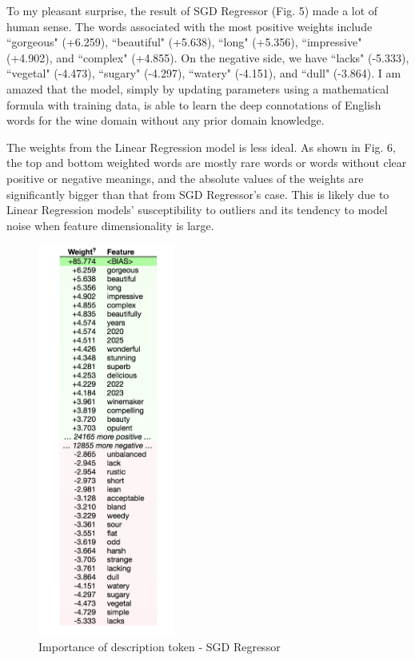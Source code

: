 \documentclass{article}
\begin{document}
To my pleasant surprise, the result of SGD Regressor (Fig. 5) made a lot of human sense. The words associated with the most positive weights include ``gorgeous" (+6.259), ``beautiful" (+5.638), ``long" (+5.356), ``impressive" (+4.902), and ``complex" (+4.855). On the negative side, we have ``lacks" (-5.333), ``vegetal" (-4.473), ``sugary" (-4.297), ``watery" (-4.151), and ``dull" (-3.864). I am amazed that the model, simply by updating parameters using a mathematical formula with training data, is able to learn the deep connotations of English words for the wine domain without any prior domain knowledge.

The weights from the Linear Regression model is less ideal. As shown in Fig. 6, the top and bottom weighted words are mostly rare words or words without clear positive or negative meanings, and the absolute values of the weights are significantly bigger than that from SGD Regressor's case. This is likely due to Linear Regression models' susceptibility to outliers and its tendency to model noise when feature dimensionality is large.

\begin{figure}[H]
\caption{Importance of description token - SGD Regressor}
\centering
\includegraphics[width=0.4\textwidth]{graphs/sgd_token_weights}
\end{figure}
\end{document}
